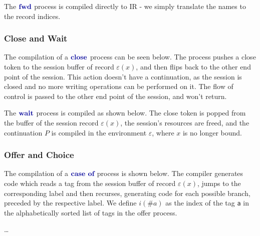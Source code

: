 The $\fwdp$ process is compiled directly to IR - we simply translate the names to the record indices.

\begin{compilation}{}{\varepsilon}
\end{compilation}

\subsubsection{Close and Wait}

The compilation of a $\closep$ process can be seen below. The process pushes a close token to the session buffer of record $\varepsilon(x)$, and then flips back to the other end point of the session. This action doesn't have a continuation, as the session is closed and no more writing operations can be performed on it. The flow of control is passed to the other end point of the session, and won't return.

\begin{compilation}{}{\varepsilon}
\end{compilation}

The $\waitp$ process is compiled as shown below. The close token is popped from the buffer of the session record $\varepsilon(x)$, the session's resources are freed, and the continuation $P$ is compiled in the environment $\varepsilon$, where $x$ is no longer bound.

\begin{compilation}{}{\varepsilon}
\end{compilation}

\subsubsection{Offer and Choice}

The compilation of a $\casep$ process is shown below. The compiler generates code which reads a tag from the session buffer of record $\varepsilon(x)$, jumps to the corresponding label and then recurses, generating code for each possible branch, preceded by the respective label. We define $i(\#a)$ as the index of the tag \texttt{a} in the alphabetically sorted list of tags in the offer process.

\begin{compilation}{}{\varepsilon}
    \beginir\dots
\end{compilation}


